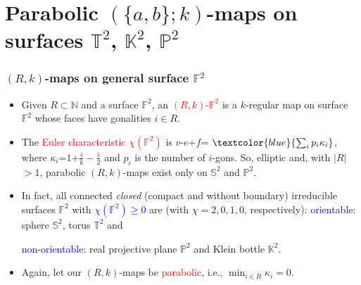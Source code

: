 \documentclass{beamer}
\begin{document}
\section{Parabolic $(\{a,b\};k)$-maps on 
surfaces $\mathbb{T}^2$, $\mathbb{K}^2$, $\mathbb{P}^2$}

 

\begin{frame}\frametitle{ $(R,k)$-maps on general surface $\mathbb{F}^2$
}
\vspace{-1mm}
\begin{itemize}

\item Given $R\subset \mathbb{N}$ and a surface $\mathbb{F}^2$, an
\textcolor{red}{$(R,k)$-$\mathbb{F}^2$} is
a $k$-regular map  on surface $\mathbb{F}^2$
whose faces have gonalities $i\in R$.

\item
The \textcolor{red}{Euler characteristic $\chi ({\mathbb{F}^2})$} is $v$-$e$+$f$=
$\textcolor{blue}{\sum_{i}p_i\kappa_i}$, 
where $\kappa_i$=$1$+$\frac{i}{k}-\frac{i}{2}$ and $p_i$ is the number of $i$-gons. So, elliptic and, with $|R|$$>$$1$,
 parabolic $(R,k)$-maps exist only on $\mathbb{S}^2$ and $\mathbb{P}^2$.

\item In fact, all connected {\em closed} (compact and without boundary) irreducible 
surfaces $\mathbb{F}^2$ with \textcolor{blue}{$\chi ({\mathbb{F}^2})$$\ge$$ 0$}
are (with $\chi=2,0,1,0$, 
respectively):
\textcolor{blue}{orientable}: sphere $\mathbb{S}^2$, torus $\mathbb{T}^2$ 
 and 
 
 \textcolor{blue}{non-orientable}:
real projective 
 plane
 $\mathbb{P}^2$ and Klein bottle $\mathbb{K}^2$.

\item
Again, let our $(R,k)$-maps be
\textcolor{red}{parabolic}, i.e.,
$\min_{i\in R}\kappa_i=0$.


\end{itemize}
\end{frame}
\end{document}
